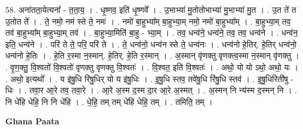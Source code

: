 \documentclass[17pt]{extarticle}
\begin{document}
58. अना॑तता॒येत्यना᳚ - त॒ता॒य॒ । . धृ॒ष्णव॒ इति॑ धृ॒ष्णवे᳚ । . उ॒भाभ्या॑ मु॒तोतोभाभ्या॑ मु॒भाभ्या॑ मु॒त । . उ॒त ते॑ त उ॒तोत ते᳚ । . ते॒ नमो॒ नम॑ स्ते ते॒ नमः॑ । . नमो॑ बा॒हुभ्या᳚म् बा॒हुभ्या॒म् नमो॒ नमो॑ बा॒हुभ्या᳚म् । . बा॒हुभ्या॒म् तव॒ तव॑ बा॒हुभ्या᳚म् बा॒हुभ्या॒म् तव॑ । . बा॒हुभ्या॒मिति॑ बा॒हु - भ्या॒म् । . तव॒ धन्व॑ने॒ धन्व॑ने॒ तव॒ तव॒ धन्व॑ने । . धन्व॑न॒ इति॒ धन्व॑ने । . परि॑ ते ते॒ परि॒ परि॑ ते । . ते॒ धन्व॑नो॒ धन्व॑न स्ते ते॒ धन्व॑नः । . धन्व॑नो हे॒तिर्. हे॒तिर् धन्व॑नो॒ धन्व॑नो हे॒तिः । . हे॒ति र॒स्मा न॒स्मान्. हे॒तिर्. हे॒ति र॒स्मान् । . अ॒स्मान् वृ॑णक्तु वृणक्त्व॒स्मा न॒स्मान् वृ॑णक्तु । . वृ॒ण॒क्तु॒ वि॒श्वतो॑ वि॒श्वतो॑ वृणक्तु वृणक्तु वि॒श्वतः॑ । . वि॒श्वत॒ इति॑ वि॒श्वतः॑ । . अथो॒ यो यो ऽथो॒ अथो॒ यः । . अथो॒ इत्यथो᳚ । . य इ॑षु॒धि रि॑षु॒धिर् यो य इ॑षु॒धिः । . इ॒षु॒धि स्तव॒ तवे॑षु॒धि रि॑षु॒धि स्तव॑ । . इ॒षु॒धिरिती॑षु - धिः । . तवा॒र आ॒रे तव॒ तवा॒रे । . आ॒रे अ॒स्म द॒स्म दा॒र आ॒रे अ॒स्मत् । . अ॒स्मन् नि न्य॑स्म द॒स्मन् नि । . नि धे॑हि धेहि॒ नि नि धे॑हि । . धे॒हि॒ तम् तम् धे॑हि धेहि॒ तम् । . तमिति॒ तम् । \newline

\textbf{Ghana Paata } \newline
\end{document}
